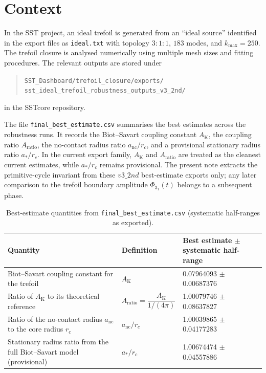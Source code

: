 \documentclass[11pt]{article}
\newcommand{\AK}{A_{\mathrm{K}}}
\newcommand{\Aratio}{A_{\mathrm{ratio}}}
\newcommand{\anc}{a_{\mathrm{nc}}}
\newcommand{\rc}{r_{\!c}}
\newcommand{\astar}{a_{\ast}}
\begin{document}
\section{Context}

In the SST project, an ideal trefoil is generated from an ``ideal source'' identified in the export files as \texttt{ideal.txt} with topology \(3{:}1{:}1\), \(183\) modes, and \(k_{\max}=250\). The trefoil closure is analysed numerically using multiple mesh sizes and fitting procedures. The relevant outputs are stored under
\begin{quote}
\texttt{SST\_Dashboard/trefoil\_closure/exports/\\
sst\_ideal\_trefoil\_robustness\_outputs\_v3\_2nd/}
\end{quote}
in the SSTcore repository.

The file \texttt{final\_best\_estimate.csv} summarises the best estimates across the robustness runs. It records the Biot--Savart coupling constant \(\AK\), the coupling ratio \(\Aratio\), the no-contact radius ratio \(\anc/\rc\), and a provisional stationary radius ratio \(\astar/\rc\). In the current export family, \(\AK\) and \(\Aratio\) are treated as the cleanest current estimates, while \(\astar/\rc\) remains provisional. The present note extracts the primitive-cycle invariant from these \(v3\_2nd\) best-estimate exports only; any later comparison to the trefoil boundary amplitude \(\Phi_{3_1}(t)\) belongs to a subsequent phase.

\begin{table}[htbp]
    \centering
    \caption{Best-estimate quantities from \texttt{final\_best\_estimate.csv} (systematic half-ranges as exported).}
    \label{tab:best-estimates}
    \begin{tabular}{@{}p{}p{}p{}@{}}
        \toprule
        \textbf{Quantity} & \textbf{Definition} & \textbf{Best estimate \(\pm\) systematic half-range} \\
        \midrule
        Biot--Savart coupling constant for the trefoil
            & \(\AK\)
            & \num{0.07964093} \(\pm\) \num{0.00687376} \\
        Ratio of \(\AK\) to its theoretical reference
            & \(\Aratio = \dfrac{\AK}{1/(4\pi)}\)
            & \num{1.00079746} \(\pm\) \num{0.08637827} \\
        Ratio of the no-contact radius \(\anc\) to the core radius \(\rc\)
            & \(\anc/\rc\)
            & \num{1.00039865} \(\pm\) \num{0.04177283} \\
        Stationary radius ratio from the full Biot--Savart model (provisional)
            & \(\astar/\rc\)
            & \num{1.00674474} \(\pm\) \num{0.04557886} \\
        \bottomrule
    \end{tabular}
\end{table}
\end{document}
